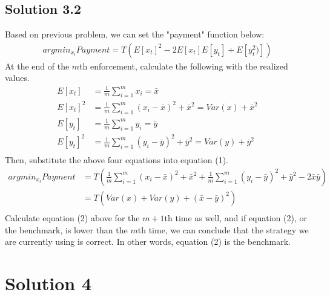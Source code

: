 \documentclass[a4paper]{article}
\theoremstyle{definition}
\newenvironment{soln}{
	\leavevmode\color{blue}\ignorespaces
}{}
\begin{document}
	\subsection*{Solution 3.2}
	\begin{soln}
		Based on previous problem, we can set the "payment" function below:
		\begin{equation}\label{xx}
			\begin{split}
			argmin_{x_t} Payment = T ( E[x_t]^2 - 2 E[x_t] E[y_t] + E[y_t^2)])
			\end{split}
		\end{equation}	
		At the end of the $m$th enforcement, calculate the following with the realized values.
		\begin{equation*}\label{xx}
			\begin{split}
			E[x_t] &= \frac{1}{m} \sum_{i=1}^{m} x_i = \bar{x} \\
			E[x_t]^2 &= \frac{1}{m} \sum_{i=1}^{m} (x_i - \bar{x} )^2   + \bar{x}^2 = Var(x) +\bar{x}^2 \\
			E[y_t] &= \frac{1}{m} \sum_{i=1}^{m} y_i = \bar{y} \\
			E[y_t]^2 &= \frac{1}{m} \sum_{i=1}^{m} (y_i - \bar{y} )^2   + \bar{y}^2 = Var(y) +\bar{y}^2 \\
			\end{split}
		\end{equation*}	
		Then, substitute the above four equations into equation (1).
		\begin{equation}\label{xx}
			\begin{split}
			argmin_{x_t} Payment &= T ( \frac{1}{m} \sum_{i=1}^{m} (x_i - \bar{x} )^2   + \bar{x}^2 +  \frac{1}{m} \sum_{i=1}^{m} (y_i - \bar{y} )^2   + \bar{y}^2 - 2 \bar{x} \bar{y} )  \\
			&= T ( Var(x) + Var(y) + (\bar{x} - \bar{y} )^2 ) \\
			\end{split}
		\end{equation}	
		Calculate equation (2) above for the $m+1$th time as well, and if equation (2), or the benchmark, is lower than the $m$th time, we can conclude that the strategy we are currently using is correct. In other words, equation (2) is the benchmark.
	\end{soln}
	
	
	\section*{Solution 4}
\end{document}
